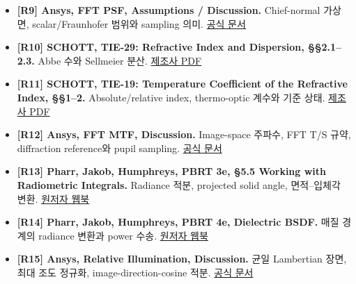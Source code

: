 \documentclass[
  a4paper,
]{article}
\begin{document}
\begin{itemize}
{  슬라이드 11--20.} 비간섭 intensity PSF, OTF, pupil 자기상관과 MTF.
  \href{https://ocw.mit.edu/courses/2-71-optics-spring-2009/bebe78c6a2ae2603a0d1a3ea85e0b4ca_MIT2_71S09_lec22.pdf}{강의
  PDF}
\item
  \textbf{{[}R9{]} Ansys, FFT PSF, Assumptions / Discussion.}
  Chief-normal 가상면, scalar/Fraunhofer 범위와 sampling 의미.
  \href{https://ansyshelp.ansys.com/public/Views/Secured/Zemax/v251/en/OpticStudio_User_Guide/OpticStudio_Help/topics/FFT_PSF.html}{공식
  문서}
\item
  \textbf{{[}R10{]} SCHOTT, TIE-29: Refractive Index and Dispersion,
  §§2.1--2.3.} Abbe 수와 Sellmeier 분산.
  \href{https://media.schott.com/api/public/content/aaa572afd854434fb7b3faa4bc46103f?v=c0f4fa52}{제조사
  PDF}
\item
  \textbf{{[}R11{]} SCHOTT, TIE-19: Temperature Coefficient of the
  Refractive Index, §§1--2.} Absolute/relative index, thermo-optic
  계수와 기준 상태.
  \href{https://media.schott.com/api/public/content/63b62a0d73a640efa8c6fde92f2ad5c2?v=97a6a05a}{제조사
  PDF}
\item
  \textbf{{[}R12{]} Ansys, FFT MTF, Discussion.} Image-space 주파수, FFT
  T/S 규약, diffraction reference와 pupil sampling.
  \href{https://ansyshelp.ansys.com/public/Views/Secured/Zemax/v252/en/OpticStudio_User_Guide/OpticStudio_Help/topics/FFT_MTF.html}{공식
  문서}
\item
  \textbf{{[}R13{]} Pharr, Jakob, Humphreys, PBRT 3e, §5.5 Working with
  Radiometric Integrals.} Radiance 적분, projected solid angle,
  면적--입체각 변환.
  \href{https://www.pbr-book.org/3ed-2018/Color_and_Radiometry/Working_with_Radiometric_Integrals}{원저자
  웹북}
\item
  \textbf{{[}R14{]} Pharr, Jakob, Humphreys, PBRT 4e, Dielectric BSDF.}
  매질 경계의 radiance 변환과 power 수송.
  \href{https://pbr-book.org/4ed/Reflection_Models/Dielectric_BSDF}{원저자
  웹북}
\item
  \textbf{{[}R15{]} Ansys, Relative Illumination, Discussion.} 균일
  Lambertian 장면, 최대 조도 정규화, image-direction-cosine 적분.
  \href{https://ansyshelp.ansys.com/public/Views/Secured/Zemax/v26102/en/OpticStudio_User_Guide/OpticStudio_Help/topics/Relative_Illumination.html}{공식
  문서}
\end{itemize}
\end{document}
